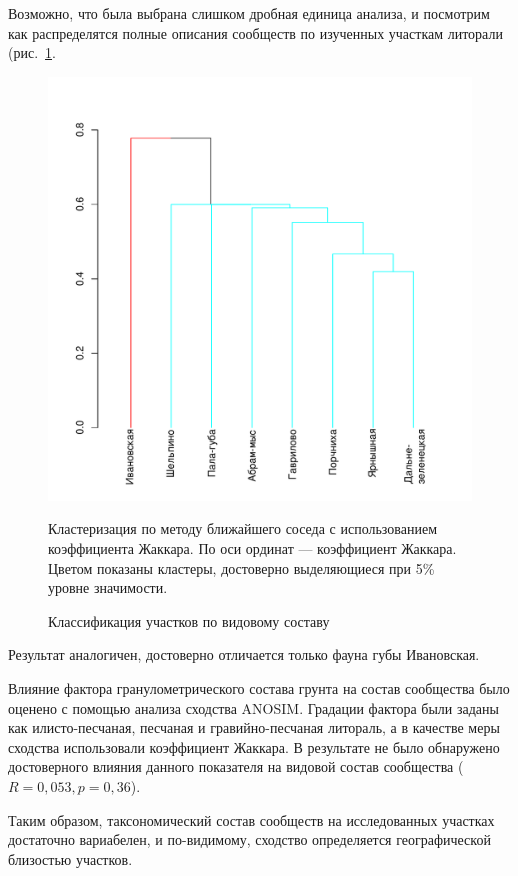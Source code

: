 Возможно, что была выбрана слишком дробная единица анализа, и посмотрим как распределятся полные описания сообществ по изученных участкам литорали (рис.~\ref{ris:cluster_barents_species_sites}. 
	\begin{figure}
		\begin{center}
			\includegraphics{../Barenc_Sea/soobshestvo/Barents_fauna_sites_jaccard_single_1.pdf}
		\end{center}
	\caption{Классификация участков по видовому составу}
	\label{ris:cluster_barents_species_sites}

	\footnotesize{Кластеризация по методу ближайшего соседа с использованием коэффициента Жаккара. По оси ординат --- коэффициент Жаккара. Цветом показаны кластеры, достоверно выделяющиеся при 5\% уровне значимости.}
	\end{figure}
Результат аналогичен, достоверно отличается только фауна губы Ивановская.

Влияние фактора гранулометрического состава грунта на состав сообщества было оценено с помощью анализа сходства ANOSIM. 
Градации фактора были заданы как илисто-песчаная, песчаная и гравийно-песчаная литораль, а в качестве меры сходства использовали коэффициент Жаккара. 
В результате не было обнаружено достоверного влияния данного показателя на видовой состав сообщества ($R=0,053, p=0,36$).
	
Таким образом, таксономический состав сообществ на исследованных участках достаточно вариабелен, и по-видимому, сходство определяется географической близостью участков. 

